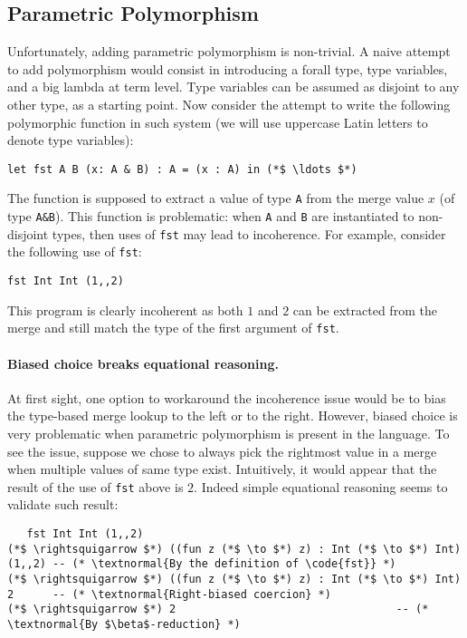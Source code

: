 \subsection{Parametric Polymorphism}
Unfortunately, adding parametric polymorphism is non-trivial.
A naive attempt to add polymorphism would consist in introducing a forall type, type variables, and a 
big lambda at term level.
Type variables can be assumed as disjoint to any other type, as a starting point.
Now consider the attempt to write the following polymorphic function in such system (we will use
uppercase Latin letters to denote type variables): 
\begin{lstlisting}
let fst A B (x: A & B) : A = (x : A) in (*$ \ldots $*)
\end{lstlisting}
The  function is supposed to extract a value of type
\lstinline{A} from the merge value $x$ (of type \lstinline{A&B}). 
This function is problematic: when
\lstinline{A} and \lstinline{B} are instantiated to non-disjoint
types, then uses of \lstinline{fst} may lead to incoherence.
For example, consider the following use of \lstinline{fst}:
\begin{lstlisting}
fst Int Int (1,,2)
\end{lstlisting}
\noindent This program is clearly incoherent as both
$1$ and $2$ can be extracted from the merge and still match the type
of the first argument of \lstinline{fst}.

\paragraph{Biased choice breaks equational reasoning.} 
At first sight, one option
to workaround the incoherence issue would be to bias the type-based merge lookup
to the left or to the right. %
However, biased choice is
very problematic when parametric polymorphism is present in the language.
To see the issue, suppose we chose to always pick the
rightmost value in a merge when multiple values of same type exist.
Intuitively, it would appear that the result of the use of
\lstinline{fst} above is $2$. 
Indeed simple equational reasoning seems to validate such result:
\begin{lstlisting}
   fst Int Int (1,,2)
(*$ \rightsquigarrow $*) ((fun z (*$ \to $*) z) : Int (*$ \to $*) Int) (1,,2) -- (* \textnormal{By the definition of \code{fst}} *)
(*$ \rightsquigarrow $*) ((fun z (*$ \to $*) z) : Int (*$ \to $*) Int) 2      -- (* \textnormal{Right-biased coercion} *)
(*$ \rightsquigarrow $*) 2                                  -- (* \textnormal{By $\beta$-reduction} *)
\end{lstlisting}

